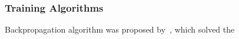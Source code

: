 \subsubsection{Training Algorithms}
Backpropagation algorithm was proposed by~\citet{werbos1975beyond}, which solved the 